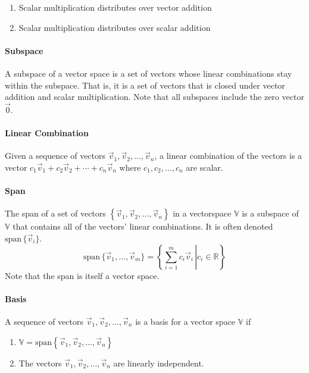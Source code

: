 \documentclass[10pt,landscape,letterpaper]{article}
\newcommand{\bvec}[1]{\mathbf{#1}}
\newcommand{\vecspace}[1]{\mathbb{#1}}
\begin{document}
\begin{multicols}{3}
\begin{enumerate}
    \item Scalar multiplication distributes over vector addition
    
    \item Scalar multiplication distributes over scalar addition
    
\end{enumerate}
\paragraph{Subspace}
A subspace of a vector space is a set of vectors whose linear combinations stay within the subspace. That is, it is a set of vectors that is closed under vector addition and scalar multiplication. Note that all subspaces include the zero vector $\vec{0}$.

\paragraph{Linear Combination}
Given a sequence of vectors $\vec{v}_1, \vec{v}_2, \ldots, \vec{v}_n$, a linear combination of the vectors is a vector $c_1\vec{v}_1 + c_2\vec{v}_2 + \cdots + c_n\vec{v}_n$ where $c_1, c_2, \ldots, c_n$ are scalar.

\paragraph{Span} The span of a set of vectors $\left\{\vec{v}_1, \vec{v}_2, \ldots, \vec{v}_n\right\}$ in a vectorspace $\vecspace{V}$ is a subspace of $\vecspace{V}$ that contains all of the vectors' linear combinations. It is often denoted $\mathrm{span}\, \{\vec{v}_i\}$.
\begin{equation*}
\mathrm{span} \, \{\vec{v}_1, \dots, \vec{v}_m\} = \left \{ { \left. \sum_{i=1}^m c_i \vec{v}_i \, \right| c_i \in \vecspace{R} } \right \}
\end{equation*}
Note that the span is itself a vector space.

\paragraph{Basis}
A sequence of vectors $\vec{v}_1, \vec{v}_2, \ldots, \vec{v}_n$ is a basis for a vector space $\vecspace{V}$ if
\begin{enumerate}
    \item $\vecspace{V}= \mathrm{span}\left\{\vec{v}_1, \vec{v}_2, \ldots, \vec{v}_n\right\}$
    \item The vectors $\vec{v}_1, \vec{v}_2, \ldots, \vec{v}_n$ are linearly independent.
\end{enumerate}


\end{multicols}
\end{document}
